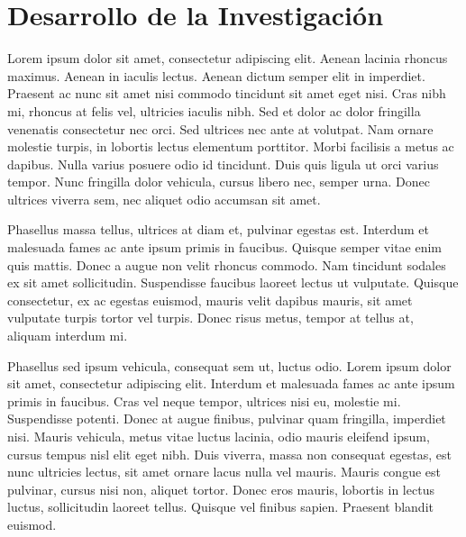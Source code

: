
\chapter{Desarrollo de la Investigación}
\label{chap:research}
Lorem ipsum dolor sit amet, consectetur adipiscing elit. Aenean lacinia rhoncus maximus. Aenean in iaculis lectus. Aenean dictum semper elit in imperdiet. Praesent ac nunc sit amet nisi commodo tincidunt sit amet eget nisi. Cras nibh mi, rhoncus at felis vel, ultricies iaculis nibh. Sed et dolor ac dolor fringilla venenatis consectetur nec orci. Sed ultrices nec ante at volutpat. Nam ornare molestie turpis, in lobortis lectus elementum porttitor. Morbi facilisis a metus ac dapibus. Nulla varius posuere odio id tincidunt. Duis quis ligula ut orci varius tempor. Nunc fringilla dolor vehicula, cursus libero nec, semper urna. Donec ultrices viverra sem, nec aliquet odio accumsan sit amet.

Phasellus massa tellus, ultrices at diam et, pulvinar egestas est. Interdum et malesuada fames ac ante ipsum primis in faucibus. Quisque semper vitae enim quis mattis. Donec a augue non velit rhoncus commodo. Nam tincidunt sodales ex sit amet sollicitudin. Suspendisse faucibus laoreet lectus ut vulputate. Quisque consectetur, ex ac egestas euismod, mauris velit dapibus mauris, sit amet vulputate turpis tortor vel turpis. Donec risus metus, tempor at tellus at, aliquam interdum mi.

Phasellus sed ipsum vehicula, consequat sem ut, luctus odio. Lorem ipsum dolor sit amet, consectetur adipiscing elit. Interdum et malesuada fames ac ante ipsum primis in faucibus. Cras vel neque tempor, ultrices nisi eu, molestie mi. Suspendisse potenti. Donec at augue finibus, pulvinar quam fringilla, imperdiet nisi. Mauris vehicula, metus vitae luctus lacinia, odio mauris eleifend ipsum, cursus tempus nisl elit eget nibh. Duis viverra, massa non consequat egestas, est nunc ultricies lectus, sit amet ornare lacus nulla vel mauris. Mauris congue est pulvinar, cursus nisi non, aliquet tortor. Donec eros mauris, lobortis in lectus luctus, sollicitudin laoreet tellus. Quisque vel finibus sapien. Praesent blandit euismod.
